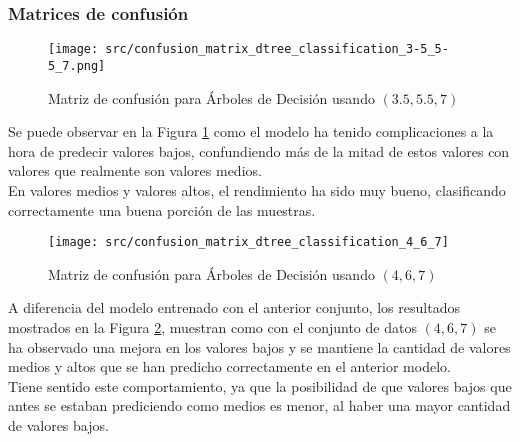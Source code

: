 \subsubsection*{Matrices de confusión}
\begin{figure}[H]
	\centering
	\texttt{[image: src/confusion\_matrix\_dtree\_classification\_3-5\_5-5\_7.png]}
	\caption{Matriz de confusión para Árboles de Decisión usando $(3.5,5.5,7)$}
	\label{fig:confusion_matrix_dtree1}
\end{figure}
Se puede observar en la Figura \ref{fig:confusion_matrix_dtree1} como el modelo ha tenido complicaciones a la hora de predecir valores bajos, confundiendo más de la mitad de estos valores con valores que realmente son valores medios.\\
En valores medios y valores altos, el rendimiento ha sido muy bueno, clasificando correctamente una buena porción de las muestras.
\clearpage
\begin{figure}[H]
	\centering
	\texttt{[image: src/confusion\_matrix\_dtree\_classification\_4\_6\_7]}
	\caption{Matriz de confusión para Árboles de Decisión usando $(4,6,7)$}
	\label{fig:confusion_matrix_dtree2}
\end{figure}
A diferencia del modelo entrenado con el anterior conjunto, los resultados mostrados en la Figura \ref{fig:confusion_matrix_dtree2}, muestran como con el conjunto de datos $(4,6,7)$ se ha observado una mejora en los valores bajos y se mantiene la cantidad de valores medios y altos que se han predicho correctamente en el anterior modelo.\\
Tiene sentido este comportamiento, ya que la posibilidad de que valores bajos que antes se estaban prediciendo como medios es menor, al haber una mayor cantidad de valores bajos.\\
\clearpage
